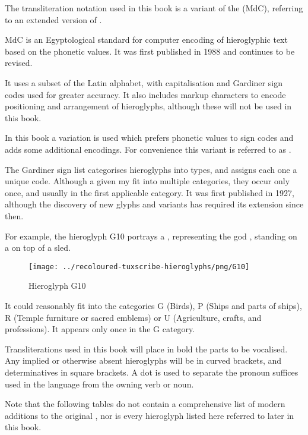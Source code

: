 The transliteration notation used in this book is a variant of the \textit{} (MdC), referring to an extended version of \textit{}.

MdC is an Egyptological standard for computer encoding of hieroglyphic text based on the phonetic values. It was first published in 1988 and continues to be revised.

It uses a subset of the Latin alphabet, with capitalisation and Gardiner sign codes used for greater accuracy. It also includes markup characters to encode positioning and arrangement of hieroglyphs, although these will not be used in this book.

In this book a variation is used which prefers phonetic values to sign codes and adds some additional encodings. For convenience this variant is referred to as .

The Gardiner sign list categorises hieroglyphs into types, and assigns each one a unique code. Although a given  my fit into multiple categories, they occur only once, and usually in the first applicable category. It was first published in 1927, although the discovery of new glyphs and variants has required its extension since then.

For example, the hieroglyph G10 portrays a , representing the god , standing on a  on top of a sled.

\begin{figure} [H]
\centering
\texttt{[image: ../recoloured-tuxscribe-hieroglyphs/png/G10]}
\caption{Hieroglyph G10}
\end{figure}

It could reasonably fit into the categories G (Birds), P (Ships and parts of ships), R (Temple furniture or sacred emblems) or U (Agriculture, crafts, and professions). It appears only once in the G category.

Transliterations used in this book will place in bold the parts to be vocalised. Any implied or otherwise absent hieroglyphs will be in curved brackets, and determinatives in square brackets. A dot is used to separate the pronoun suffices used in the language from the owning verb or noun.

Note that the following tables do not contain a comprehensive list of modern additions to the original , nor is every hieroglyph listed here referred to later in this book.

